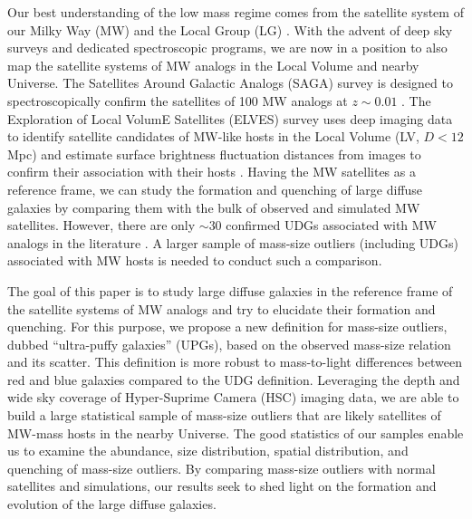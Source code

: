 \documentclass[twocolumn,astrosymb,twocolappendix]{aastex631}
\begin{document}
\begin{CJK*}{UTF8}{gbsn}
Our best understanding of the low mass regime comes from the satellite system of our Milky Way (MW) and the Local Group (LG) \citep[e.g.,][]{McConnachie2012,Simon2019}. With the advent of deep sky surveys and dedicated spectroscopic programs, we are now in a position to also map the satellite systems of MW analogs in the Local Volume and nearby Universe. The Satellites Around Galactic Analogs (SAGA) survey is designed to spectroscopically confirm the satellites of 100 MW analogs at $z\sim0.01$ \citep{SAGA-I,SAGA-II}. The Exploration of Local VolumE Satellites (ELVES) survey uses deep imaging data to identify satellite candidates of MW-like hosts in the Local Volume (LV, $D<12$ Mpc) and estimate surface brightness fluctuation distances from images to confirm their association with their hosts \citep{ELVES-I,ELVES-II,CarlstenELVES2022}. Having the MW satellites as a reference frame, we can study the formation and quenching of large diffuse galaxies by comparing them with the bulk of observed and simulated MW satellites. However, there are only $\sim 30$ confirmed UDGs associated with MW analogs in the literature \citep{Roman2017b,Cohen2018,SAGA-II,CarlstenELVES2022}. A larger sample of mass-size outliers (including UDGs) associated with MW hosts is needed to conduct such a comparison.

The goal of this paper is to study large diffuse galaxies in the reference frame of the satellite systems of MW analogs and try to elucidate their formation and quenching. For this purpose, we propose a new definition for mass-size outliers, dubbed ``ultra-puffy galaxies'' (UPGs), based on the observed mass-size relation and its scatter. This definition is more robust to mass-to-light differences between red and blue galaxies compared to the UDG definition. Leveraging the depth and wide sky coverage of Hyper-Suprime Camera (HSC) imaging data, we are able to build a large statistical sample of mass-size outliers that are likely satellites of MW-mass hosts in the nearby Universe. The good statistics of our samples enable us to examine the abundance, size distribution, spatial distribution, and quenching of mass-size outliers. By comparing mass-size outliers with normal satellites and simulations, our results seek to shed light on the formation and evolution of the large diffuse galaxies. 



\end{CJK*}
\end{document}
